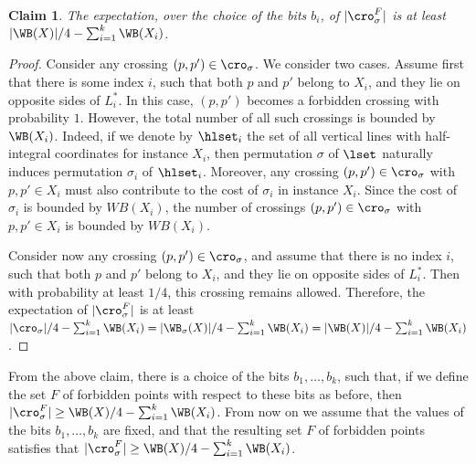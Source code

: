 \documentclass[11pt]{article}
\numberwithin{equation}{section}
\newtheorem{claim}[theorem]{Claim}
\theoremstyle{definition}
\theoremstyle{plain}
\begin{document}
\begin{claim}\label{claim: many expected crossings}
	The expectation, over the choice of the bits $b_i$, of $|\cro^F_{\sigma}|$ is at least $|\WB(X)|/4-\sum_{i=1}^k\WB(X_i)$.
\end{claim}

\begin{proof}
	Consider any crossing $(p,p')\in \cro_{\sigma}$. We consider two cases. Assume first that there is some index $i$, such that both $p$ and $p'$ belong to $X_i$, and they lie on opposite sides of $L^*_i$. In this case, $(p,p')$ becomes a forbidden crossing with probability $1$. However, the total number of all such crossings is bounded by $\WB(X_i)$. Indeed, if we denote by $\hlset_i$ the set of all vertical lines with half-integral coordinates for instance $X_i$, then permutation $\sigma$ of $\lset$ naturally induces permutation $\sigma_i$ of $\hlset_i$. Moreover, any crossing $(p,p')\in\cro_{\sigma}$ with $p,p'\in X_i$ must also contribute to the cost of $\sigma_i$ in instance $X_i$. Since the cost of $\sigma_i$ is bounded by $WB(X_i)$, the number of crossings  $(p,p')\in \cro_{\sigma}$ with $p,p'\in X_i$ is bounded by $WB(X_i)$.
	
	Consider now any crossing $(p,p')\in \cro_{\sigma}$, and assume that there is no  index $i$, such that both $p$ and $p'$ belong to $X_i$, and they lie on opposite sides of $L^*_i$. Then with probability at least $1/4$, this crossing remains allowed. Therefore, the expectation of $|\cro^F_{\sigma}|$ is at least $|\cro_{\sigma}|/4-\sum_{i=1}^k\WB(X_i)=|\WB_{\sigma}(X)|/4-\sum_{i=1}^k\WB(X_i)=|\WB(X)|/4-\sum_{i=1}^k\WB(X_i) $.
\end{proof}


From the above claim, there is a choice of the bits $b_1,\ldots,b_k$, such that, if we define the set $F$ of forbidden points with respect to these bits as before, then $|\cro^F_{\sigma}|\geq \WB(X)/4-\sum_{i=1}^k\WB(X_i)$. From now on we assume that the values of the bits $b_1,\ldots,b_k$ are fixed, and that the resulting set $F$ of forbidden points satisfies that $|\cro^F_{\sigma}|\geq \WB(X)/4-\sum_{i=1}^k\WB(X_i)$.


%
%
%
%
\end{document}
